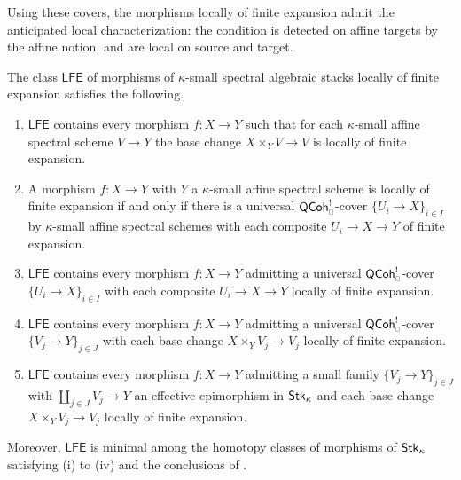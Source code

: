 Using these covers, the morphisms locally of finite expansion admit the anticipated local characterization: the condition is detected on affine targets by the affine notion, and are local on source and target.
\begin{proposition}\label{prop: locally of finite expansion characterization}
    The class $\mathsf{LFE}$ of morphisms of $\kappa$-small spectral algebraic stacks locally of finite expansion satisfies the following.
    \begin{enumerate}[label=(\roman*)]
        \item $\mathsf{LFE}$ contains every morphism $f: X\to Y$ such that for each $\kappa$-small affine spectral scheme $V\to Y$ the base change $X\times_{Y}V\to V$ is locally of finite expansion.
        \item A morphism $f: X\to Y$ with $Y$ a $\kappa$-small affine spectral scheme is locally of finite expansion if and only if there is a universal $\QCoh^{!}_{\sld}$-cover $\{U_{i}\to X\}_{i\in I}$ by $\kappa$-small affine spectral schemes with each composite $U_{i}\to X\to Y$ of finite expansion.
        \item $\mathsf{LFE}$ contains every morphism $f: X\to Y$ admitting a universal $\QCoh^{!}_{\sld}$-cover $\{U_{i}\to X\}_{i\in I}$ with each composite $U_{i}\to X\to Y$ locally of finite expansion.
        \item $\mathsf{LFE}$ contains every morphism $f: X\to Y$ admitting a universal $\QCoh_{\sld}^{!}$-cover $\{V_{j}\to Y\}_{j\in J}$ with each base change $X\times_{Y}V_{j}\to V_{j}$ locally of finite expansion.
        \item $\mathsf{LFE}$ contains every morphism $f: X\to Y$ admitting a small family $\{V_{j}\to Y\}_{j\in J}$ with $\coprod_{j\in J}V_{j}\to Y$ an effective epimorphism in $\mathsf{Stk}_{\kappa}$ and each base change $X\times_{Y}V_{j}\to V_{j}$ locally of finite expansion.
    \end{enumerate}
    Moreover, $\mathsf{LFE}$ is minimal among the homotopy classes of morphisms of $\mathsf{Stk}_{\kappa}$ satisfying (i) to (iv) and the conclusions of . 
\end{proposition}
